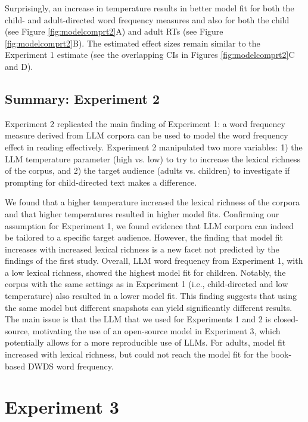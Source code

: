 \documentclass[manuscript]{stjour}
\begin{document}
Surprisingly, an increase in temperature results in better model fit for both the child- and adult-directed word frequency measures and also for both the child (see Figure \ref{fig:modelcomprt2}A) and adult RTs (see Figure \ref{fig:modelcomprt2}B). The estimated effect sizes remain similar to the Experiment 1 estimate (see the overlapping CIs in Figures \ref{fig:modelcomprt2}C and D). 


\subsection*{Summary: Experiment 2}

Experiment 2 replicated the main finding of Experiment 1: a word frequency measure derived from LLM corpora can be used to model the word frequency effect in reading effectively. Experiment 2 manipulated two more variables: 1) the LLM temperature parameter (high vs. low) to try to increase the lexical richness of the corpus, and 2) the target audience (adults vs. children) to investigate if prompting for child-directed text makes a difference.  

We found that a higher temperature increased the lexical richness of the corpora and that higher temperatures resulted in higher model fits. Confirming our assumption for Experiment 1, we found evidence that LLM corpora can indeed be tailored to a specific target audience. However, the finding that model fit increases with increased lexical richness is a new facet not predicted by the findings of the first study. Overall, LLM word frequency from Experiment 1, with a low lexical richness, showed the highest model fit for children. Notably, the corpus with the same settings as in Experiment 1 (i.e., child-directed and low temperature) also resulted in a lower model fit. This finding suggests that using the same model but different snapshots can yield significantly different results. The main issue is that the LLM that we used for Experiments 1 and 2 is closed-source, motivating the use of an open-source model in Experiment 3, which potentially allows for a more reproducible use of LLMs. For adults, model fit increased with lexical richness, but could not reach the model fit for the book-based DWDS word frequency.

\section{Experiment 3}
\end{document}

